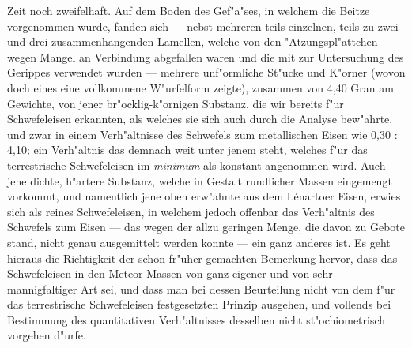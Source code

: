 \documentclass[a4paper, 11pt, oneside, german]{article}
\begin{document}
{Zeit noch zweifelhaft. Auf dem Boden des Gef"a"ses, in welchem die Beitze vorgenommen wurde, fanden sich --- nebst mehreren teils einzelnen, teils zu zwei und drei zusammenhangenden Lamellen, welche von den "Atzungspl"attchen wegen Mangel an Verbindung abgefallen waren und die mit zur Untersuchung des Gerippes verwendet wurden --- mehrere unf"ormliche St"ucke und K"orner (wovon doch eines eine vollkommene W"urfelform zeigte), zusammen von 4,40 Gran am Gewichte, von jener br"ocklig-k"ornigen Substanz, die wir bereits f"ur Schwefeleisen erkannten, als welches sie sich auch durch die Analyse bew"ahrte, und zwar in einem Verh"altnisse des Schwefels zum metallischen Eisen wie 0,30 : 4,10; ein Verh"altnis das demnach weit unter jenem steht, welches f"ur das terrestrische Schwefeleisen im \emph{minimum} als konstant angenommen wird. Auch jene dichte, h"artere Substanz, welche in Gestalt rundlicher Massen eingemengt vorkommt, und namentlich jene oben erw"ahnte aus dem Lénartoer Eisen, erwies sich als reines Schwefeleisen, in welchem jedoch offenbar das Verh"altnis des Schwefels zum Eisen --- das wegen der allzu geringen Menge, die davon zu Gebote stand, nicht genau ausgemittelt werden konnte --- ein ganz anderes ist. Es geht hieraus die Richtigkeit der schon fr"uher gemachten Bemerkung hervor, dass das Schwefeleisen in den Meteor-Massen von ganz eigener und von sehr mannigfaltiger Art sei, und dass man bei dessen Beurteilung nicht von dem f"ur das terrestrische Schwefeleisen festgesetzten Prinzip ausgehen, und vollends bei Bestimmung des quantitativen Verh"altnisses desselben nicht st"ochiometrisch vorgehen d"urfe.\\
}
\end{document}
